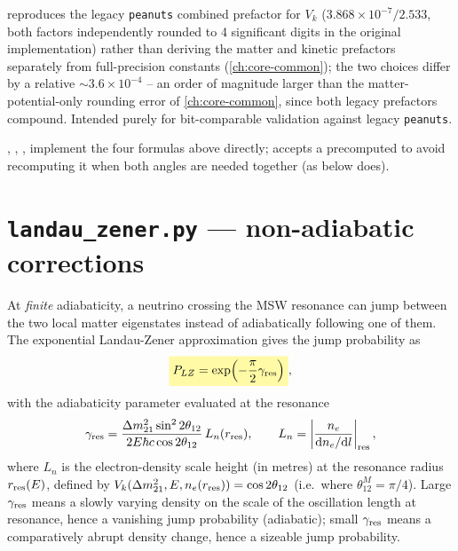 \begin{notebox}
 reproduces the legacy \texttt{peanuts}
combined prefactor for $V_k$ ($3.868\times10^{-7}/2.533$, both factors
independently rounded to 4 significant digits in the original
implementation) rather than deriving the matter and kinetic prefactors
separately from full-precision constants (\cref{ch:core-common}); the two
choices differ by a relative $\sim3.6\times10^{-4}$ -- an order of
magnitude larger than the matter-potential-only rounding error of
\cref{ch:core-common}, since both legacy prefactors compound. Intended
purely for bit-comparable validation against legacy \texttt{peanuts}.
\end{notebox}

\begin{implbox}
,
, ,
 implement the four
formulas above directly;  accepts a precomputed
 to avoid recomputing it when both angles are needed together
(as  below does).
\end{implbox}

\section{\texttt{landau\_zener.py} --- non-adiabatic corrections}
\label{sec:solar-lz}


\begin{theorybox}
At \emph{finite} adiabaticity, a neutrino crossing the MSW resonance can
jump between the two local matter eigenstates instead of adiabatically
following one of them. The exponential Landau-Zener approximation
\parencite{Parke1986} gives the jump probability as
\begin{equation}
  \keyresult{P_{LZ} = \exp\!\left(-\frac{\pi}{2}\gamma_{\rm res}\right)},
\end{equation}
with the adiabaticity parameter evaluated at the resonance
\parencite{GiuntiKim2007}
\begin{equation}
  \gamma_{\rm res} = \frac{\Delta m^2_{21}\sin^22\theta_{12}}{2E\hbar c\cos2\theta_{12}}\,L_n(r_{\rm res}),
  \qquad
  L_n = \left|\frac{n_e}{\mathrm{d}n_e/\mathrm{d}l}\right|_{\rm res},
\end{equation}
where $L_n$ is the electron-density scale height (in metres) at the
resonance radius $r_{\rm res}(E)$, defined by $V_k(\Delta m^2_{21},E,n_e(r_{\rm
res}))=\cos2\theta_{12}$ (i.e.\ where $\theta_{12}^M=\pi/4$). Large
$\gamma_{\rm res}$ means a slowly varying density on the scale of the
oscillation length at resonance, hence a vanishing jump probability
(adiabatic); small $\gamma_{\rm res}$ means a comparatively abrupt density
change, hence a sizeable jump probability.
\end{theorybox}


